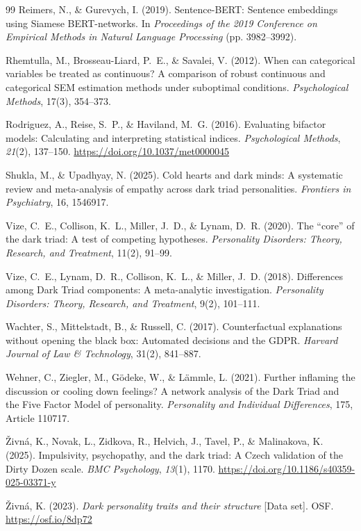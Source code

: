 \documentclass[11pt,twocolumn]{article}
\begin{document}
\begin{thebibliography}{99}
Reimers, N., \& Gurevych, I. (2019). Sentence-BERT: Sentence embeddings using Siamese BERT-networks. In \textit{Proceedings of the 2019 Conference on Empirical Methods in Natural Language Processing} (pp. 3982--3992).

Rhemtulla, M., Brosseau-Liard, P.~E., \& Savalei, V. (2012). When can categorical variables be treated as continuous? A comparison of robust continuous and categorical SEM estimation methods under suboptimal conditions. \textit{Psychological Methods}, 17(3), 354--373.

Rodriguez, A., Reise, S.~P., \& Haviland, M.~G. (2016). Evaluating bifactor models: Calculating and interpreting statistical indices. \textit{Psychological Methods}, \textit{21}(2), 137--150. \url{https://doi.org/10.1037/met0000045}

Shukla, M., \& Upadhyay, N. (2025). Cold hearts and dark minds: A systematic review and meta-analysis of empathy across dark triad personalities. \textit{Frontiers in Psychiatry}, 16, 1546917.

Vize, C.~E., Collison, K.~L., Miller, J.~D., \& Lynam, D.~R. (2020). The ``core'' of the dark triad: A test of competing hypotheses. \textit{Personality Disorders: Theory, Research, and Treatment}, 11(2), 91--99.

Vize, C.~E., Lynam, D.~R., Collison, K.~L., \& Miller, J.~D. (2018). Differences among Dark Triad components: A meta-analytic investigation. \textit{Personality Disorders: Theory, Research, and Treatment}, 9(2), 101--111.

Wachter, S., Mittelstadt, B., \& Russell, C. (2017). Counterfactual explanations without opening the black box: Automated decisions and the GDPR. \textit{Harvard Journal of Law \& Technology}, 31(2), 841--887.

Wehner, C., Ziegler, M., G\"odeke, W., \& L\"ammle, L. (2021). Further inflaming the discussion or cooling down feelings? A network analysis of the Dark Triad and the Five Factor Model of personality. \textit{Personality and Individual Differences}, 175, Article 110717.

\v{Z}ivn\'{a}, K., Novak, L., Zidkova, R., Helvich, J., Tavel, P., \& Malinakova, K. (2025). Impulsivity, psychopathy, and the dark triad: A Czech validation of the Dirty Dozen scale. \textit{BMC Psychology}, \textit{13}(1), 1170. \url{https://doi.org/10.1186/s40359-025-03371-y}

\v{Z}ivn\'{a}, K. (2023). \textit{Dark personality traits and their structure} [Data set]. OSF. \url{https://osf.io/8dp72}

\end{thebibliography}
\end{document}

